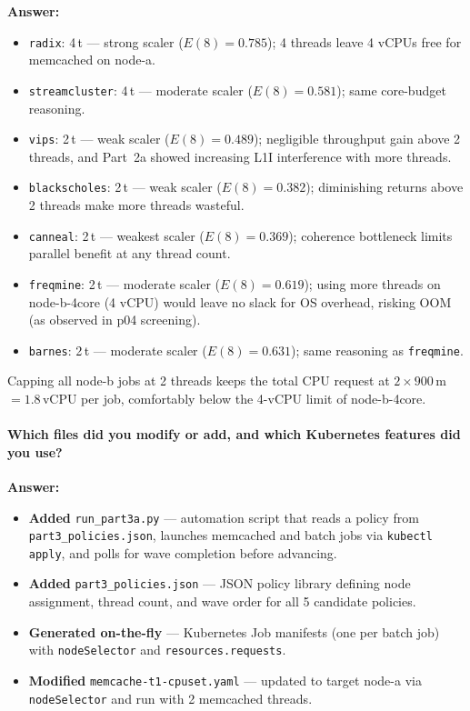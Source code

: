 \textbf{Answer:}
\begin{itemize}
  \item \texttt{radix}: 4\,t — strong scaler ($E(8)=0.785$); 4 threads
    leave 4 vCPUs free for memcached on node-a.
  \item \texttt{streamcluster}: 4\,t — moderate scaler ($E(8)=0.581$);
    same core-budget reasoning.
  \item \texttt{vips}: 2\,t — weak scaler ($E(8)=0.489$); negligible
    throughput gain above 2 threads, and Part~2a showed increasing L1I
    interference with more threads.
  \item \texttt{blackscholes}: 2\,t — weak scaler ($E(8)=0.382$);
    diminishing returns above 2 threads make more threads wasteful.
  \item \texttt{canneal}: 2\,t — weakest scaler ($E(8)=0.369$);
    coherence bottleneck limits parallel benefit at any thread count.
  \item \texttt{freqmine}: 2\,t — moderate scaler ($E(8)=0.619$); using
    more threads on node-b-4core (4 vCPU) would leave no slack for OS
    overhead, risking OOM (as observed in p04 screening).
  \item \texttt{barnes}: 2\,t — moderate scaler ($E(8)=0.631$); same
    reasoning as \texttt{freqmine}.
\end{itemize}

Capping all node-b jobs at 2 threads keeps the total CPU request at
$2 \times 900$\,m $= 1.8$\,vCPU per job, comfortably below the 4-vCPU
limit of node-b-4core.

\paragraph{Which files did you modify or add, and which Kubernetes features
did you use?}

\textbf{Answer:}
\begin{itemize}
  \item \textbf{Added} \texttt{run\_part3a.py} — automation script that
    reads a policy from \texttt{part3\_policies.json}, launches memcached
    and batch jobs via \texttt{kubectl apply}, and polls for wave completion
    before advancing.
  \item \textbf{Added} \texttt{part3\_policies.json} — JSON policy library
    defining node assignment, thread count, and wave order for all 5
    candidate policies.
  \item \textbf{Generated on-the-fly} — Kubernetes Job manifests (one per
    batch job) with \texttt{nodeSelector} and \texttt{resources.requests}.
  \item \textbf{Modified} \texttt{memcache-t1-cpuset.yaml} — updated to
    target node-a via \texttt{nodeSelector} and run with 2 memcached
    threads.
\end{itemize}

